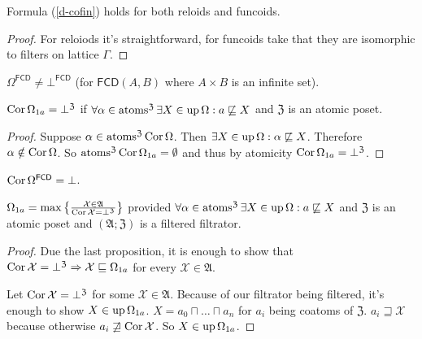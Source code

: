 \begin{cor}
  Formula (\ref{d-cofin}) holds for both reloids and funcoids.
\end{cor}

\begin{proof}
  For reloiods it's straightforward, for funcoids take that they are
  isomorphic to filters on lattice $\Gamma$.
\end{proof}

\begin{cor}
$\Omega^{\mathsf{FCD}} \ne \bot^{\mathsf{FCD}}$ (for $\mathsf{FCD}(A,B)$ where $A\times B$ is an infinite set).
\end{cor}

\begin{prop}
  $\operatorname{Cor} \Omega_{1 a} = \bot^{\mathfrak{Z}}$ if $\forall \alpha \in
  \operatorname{atoms}^{\mathfrak{Z}} \exists X \in \operatorname{up} \Omega : a
  \not\sqsubseteq X$ and $\mathfrak{Z}$ is an atomic poset.
\end{prop}

\begin{proof}
  Suppose $\alpha \in \operatorname{atoms}^{\mathfrak{Z}} \operatorname{Cor} \Omega$. Then
  $\exists X \in \operatorname{up} \Omega : \alpha \not\sqsubseteq X$.
  Therefore $\alpha \notin \operatorname{Cor} \Omega$. So $\operatorname{atoms}^{\mathfrak{Z}}
  \operatorname{Cor} \Omega_{1 a} = \emptyset$ and thus by atomicity $\operatorname{Cor}
  \Omega_{1 a} = \bot^{\mathfrak{Z}}$.
\end{proof}

\begin{cor}
  $\operatorname{Cor} \Omega^{\mathsf{FCD}} = \bot$.
\end{cor}

\begin{prop}
  $\Omega_{1 a} = \max \left\{ \frac{ \mathcal{X} \in \mathfrak{A} }{
  \operatorname{Cor} \mathcal{X} = \bot^{\mathfrak{Z}} }\right\}$ provided
  $\forall \alpha \in \operatorname{atoms}^{\mathfrak{Z}} \exists X \in \operatorname{up}
  \Omega : a \not\sqsubseteq X$ and $\mathfrak{Z}$ is an atomic
  poset and $(\mathfrak{A}; \mathfrak{Z})$ is a filtered filtrator.
\end{prop}

\begin{proof}
  Due the last proposition, it is enough to show that $\operatorname{Cor} \mathcal{X}
  = \bot^{\mathfrak{Z}} \Rightarrow \mathcal{X} \sqsubseteq \Omega_{1 a}$ for
  every $\mathcal{X} \in \mathfrak{A}$.
  
  Let $\operatorname{Cor} \mathcal{X} = \bot^{\mathfrak{Z}}$ for some $\mathcal{X} \in
  \mathfrak{A}$. Because of our filtrator being filtered, it's enough to show
  $X \in \operatorname{up} \Omega_{1 a}$. $X = a_0 \sqcap \ldots \sqcap a_n$ for $a_i$
  being coatoms of $\mathfrak{Z}$. $a_i \sqsupseteq \mathcal{X}$ because
  otherwise $a_i \not\sqsupseteq \operatorname{Cor} \mathcal{X}$. So $X
  \in \operatorname{up} \Omega_{1 a}$.
\end{proof}

